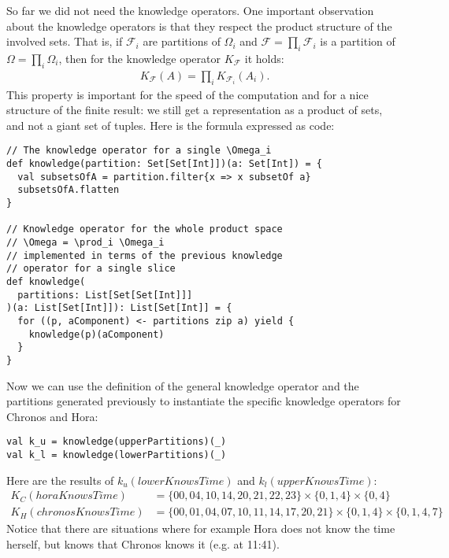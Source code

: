 \documentclass{scrartcl}
\begin{document}
So far we did not need the knowledge operators.
One important observation about the knowledge operators is
that they respect the product structure of the involved
sets. That is, if $\mathcal{F}_i$ are partitions of 
$\Omega_i$ and $\mathcal{F} = \prod_i \mathcal{F}_i$ 
is a partition of $\Omega = \prod_i \Omega_i$, then
for the knowledge operator $K_{\mathcal{F}}$ it holds:
\begin{align*}
  K_{\mathcal{F}}(A) = \prod_i K_{\mathcal{F}_i}(A_i).
\end{align*}
This property is important for the speed of the 
computation and for a nice structure of the finite 
result: we still get a representation as a product of sets, and not a giant set of tuples.
Here is the formula expressed as code:
\begin{lstlisting}
// The knowledge operator for a single \Omega_i
def knowledge(partition: Set[Set[Int]])(a: Set[Int]) = {
  val subsetsOfA = partition.filter{x => x subsetOf a}
  subsetsOfA.flatten
}

// Knowledge operator for the whole product space
// \Omega = \prod_i \Omega_i
// implemented in terms of the previous knowledge 
// operator for a single slice
def knowledge(
  partitions: List[Set[Set[Int]]]
)(a: List[Set[Int]]): List[Set[Int]] = {
  for ((p, aComponent) <- partitions zip a) yield {
    knowledge(p)(aComponent)
  }
}
\end{lstlisting}
Now we can use the definition of the general knowledge operator
and the partitions generated previously to instantiate
the specific knowledge operators for Chronos and Hora:
\begin{lstlisting}
val k_u = knowledge(upperPartitions)(_)
val k_l = knowledge(lowerPartitions)(_)
\end{lstlisting}
Here are the results of $k_u(lowerKnowsTime)$ and
$k_l(upperKnowsTime)$:
\begin{align*}
  K_C(horaKnowsTime) &= 
    \{00,04,10,14,20,21,22,23\} \times
    \{0,1,4\} \times 
    \{0,4\} \\
  K_H(chronosKnowsTime) &=
    \{00,01,04,07,10,11,14,17,20,21\} 
    \times 
    \{0,1,4\} \times 
    \{0,1,4,7\}
\end{align*}
Notice that there are situations where for example
Hora does not know the time herself, but knows that
Chronos knows it (e.g. at 11:41).
\end{document}
